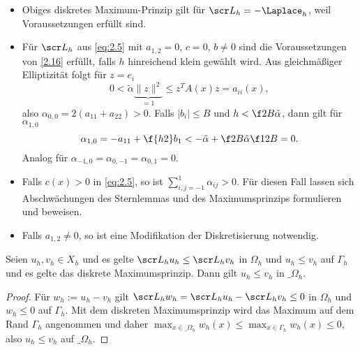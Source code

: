 \begin{note}
	\begin{itemize}
		\item
			Obiges diskretes Maximum-Prinzip gilt für $\scr L_h = - \Laplace_h$, weil Voraussetzungen erfüllt sind.
		\item
			Für $\scr L_h$ aus \eqref{eq:2.5} mit $a_{1,2} = 0$, $c = 0$, $b \neq 0$ sind die Voraussetzungen von \ref{2.16} erfüllt, falls $h$ hinreichend klein gewählt wird.
			Aus gleichmäßiger Elliptizität folgt für $z = e_i$
			\[
				0 < \tilde \alpha \underbrace{\|z\|^2}_{= 1} \le z^T A(x) z = a_{ii}(x),
			\]
			also $\alpha_{0,0} = 2(a_{11} + a_{22}) > 0$.
			Falls $|b_i| \le B$ und $h < \f 2B \tilde \alpha$, dann gilt für $\alpha_{1,0}$
			\[
				\alpha_{1,0}
				= -a_{11} + \f {h2} b_1
				< -\tilde \alpha + \f 2B \tilde \alpha \f 12 B
				= 0.
			\]
			Analog für $\alpha_{-1,0} = \alpha_{0,-1} = \alpha_{0,1} = 0$.
		\item
			Falls $c(x) > 0$ in \eqref{eq:2.5}, so ist $\sum_{i,j = -1}^1 \alpha_{ij} > 0$.
			Für diesen Fall lassen sich Abschwächungen des Sternlemmas und des Maximumsprinzips formulieren und beweisen.
		\item
			Falls $a_{1,2} \neq 0$, so ist eine Modifikation der Diskretisierung notwendig.
	\end{itemize}
\end{note}

\begin{kor} \label{2.18}
	Seien $u_h, v_h \in X_h$ und es gelte $\scr L_h u_h \le \scr L_h v_h$ in $\Omega_h$ und $u_h \le v_h$ auf $\Gamma_h$ und es gelte das diskrete Maximumsprinzip.
	Dann gilt $u_h \le v_h$ in $\_\Omega_h$.
	\begin{proof}
		Für $w_h := u_h - v_h$ gilt $\scr L_h w_h = \scr L_h u_h - \scr L_h v_h \le 0$ in $\Omega_h$ und $w_h \le 0$ auf $\Gamma_h$.
		Mit dem diskreten Maximumsprinzip wird das Maximum auf dem Rand $\Gamma_h$ angenommen und daher $\max_{x\in \_\Omega_h} w_h(x) \le \max_{x\in\Gamma_h}w_h(x) \le 0$, also $u_h \le v_h$ auf $\_\Omega_h$.
	\end{proof}
\end{kor}

